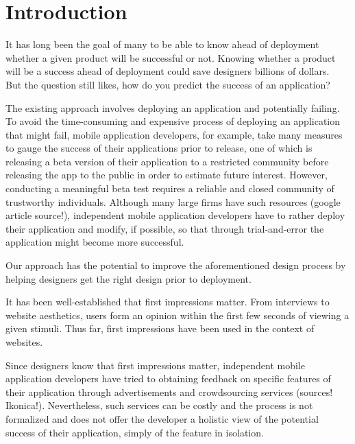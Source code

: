 \section{Introduction}

It has long been the goal of many to be able to know ahead of deployment whether a given product will be successful or not. Knowing whether a product will be a success ahead of deployment could save designers billions of dollars.~\cite{tohidi06:getting} But the question still likes, how do you predict the success of an application?

The existing approach involves deploying an application and potentially failing. To avoid the time-consuming and expensive process of deploying an application that might fail, mobile application developers, for example, take many measures to gauge the success of their applications prior to release, one of which is releasing a beta version of their application to a restricted community before releasing the app to the public in order to estimate future interest. However, conducting a meaningful beta test requires a reliable and closed community of trustworthy individuals. Although many large firms have such resources (google article source!), independent mobile application developers have to rather deploy their application and modify, if possible, so that through trial-and-error the application might become more successful.

Our approach has the potential to improve the aforementioned design process by helping designers get the right design prior to deployment.

It has been well-established that first impressions matter. From interviews to website aesthetics, users form an opinion within the first few seconds of viewing a given stimuli. Thus far, first impressions have been used in the context of websites.

Since designers know that first impressions matter, independent mobile application developers have tried to obtaining feedback on specific features of their application through advertisements and crowdsourcing services (sources! Ikonica!). Nevertheless, such services can be costly and the process is not formalized and does not offer the developer a holistic view of the potential success of their application, simply of the feature in isolation.

